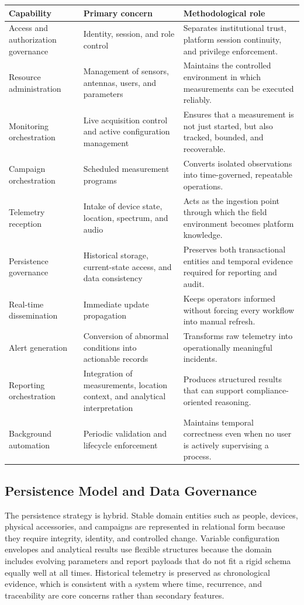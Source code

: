 \documentclass[11pt,a4paper]{article}
\begin{document}
\begin{longtable}{@{}p{}p{}p{}@{}}
\toprule
\textbf{Capability} & \textbf{Primary concern} & \textbf{Methodological role} \\
\midrule
\endhead
Access and authorization governance & Identity, session, and role control & Separates institutional trust, platform session continuity, and privilege enforcement. \\
Resource administration & Management of sensors, antennas, users, and parameters & Maintains the controlled environment in which measurements can be executed reliably. \\
Monitoring orchestration & Live acquisition control and active configuration management & Ensures that a measurement is not just started, but also tracked, bounded, and recoverable. \\
Campaign orchestration & Scheduled measurement programs & Converts isolated observations into time-governed, repeatable operations. \\
Telemetry reception & Intake of device state, location, spectrum, and audio & Acts as the ingestion point through which the field environment becomes platform knowledge. \\
Persistence governance & Historical storage, current-state access, and data consistency & Preserves both transactional entities and temporal evidence required for reporting and audit. \\
Real-time dissemination & Immediate update propagation & Keeps operators informed without forcing every workflow into manual refresh. \\
Alert generation & Conversion of abnormal conditions into actionable records & Transforms raw telemetry into operationally meaningful incidents. \\
Reporting orchestration & Integration of measurements, location context, and analytical interpretation & Produces structured results that can support compliance-oriented reasoning. \\
Background automation & Periodic validation and lifecycle enforcement & Maintains temporal correctness even when no user is actively supervising a process. \\
\bottomrule
\end{longtable}

\subsection{Persistence Model and Data Governance}
The persistence strategy is hybrid. Stable domain entities such as people, devices, physical accessories, and campaigns are represented in relational form because they require integrity, identity, and controlled change. Variable configuration envelopes and analytical results use flexible structures because the domain includes evolving parameters and report payloads that do not fit a rigid schema equally well at all times. Historical telemetry is preserved as chronological evidence, which is consistent with a system where time, recurrence, and traceability are core concerns rather than secondary features.
\end{document}
